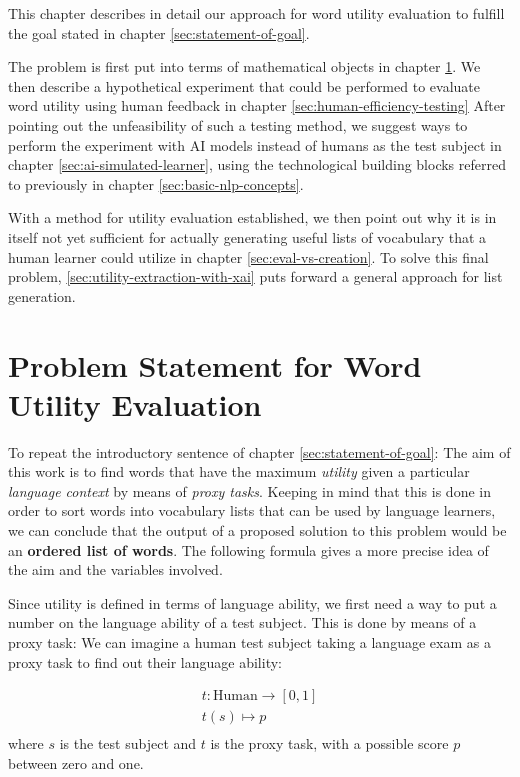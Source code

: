 This chapter describes in detail our approach for word utility evaluation to fulfill the goal stated in chapter \ref{sec:statement-of-goal}.

The problem is first put into terms of mathematical objects in chapter \ref{sec:problem-statement-formal}.
We then describe a hypothetical experiment that could be performed to evaluate word utility using human feedback in chapter \ref{sec:human-efficiency-testing}
After pointing out the unfeasibility of such a testing method, we suggest ways to perform the experiment with AI models instead of humans as the test subject in chapter \ref{sec:ai-simulated-learner}, using the technological building blocks referred to previously in chapter \ref{sec:basic-nlp-concepts}.

With a method for utility evaluation established, we then point out why it is in itself not yet sufficient for actually generating useful lists of vocabulary that a human learner could utilize in chapter \ref{sec:eval-vs-creation}.
To solve this final problem, \ref{sec:utility-extraction-with-xai} puts forward a general approach for list generation.

\section{Problem Statement for Word Utility Evaluation} \label{sec:problem-statement-formal}


To repeat the introductory sentence of chapter \ref{sec:statement-of-goal}:
The aim of this work is to find words that have the maximum \textit{utility} given a particular \textit{language context} by means of \textit{proxy tasks}.
Keeping in mind that this is done in order to sort words into vocabulary lists that can be used by language learners, we can conclude that the output of a proposed solution to this problem would be an \textbf{ordered list of words}. The following formula gives a more precise idea of the aim and the variables involved.

Since utility is defined in terms of language ability, we first need a way to put a number on the language ability of a test subject. This is done by means of a proxy task: We can imagine a human test subject taking a language exam as a proxy task to find out their language ability:

\begin{align*}
	t: \text{Human} \to [0, 1] \\
	t (s) \mapsto p            \\
\end{align*}
where $s$ is the test subject and $t$ is the proxy task, with a possible score $p$ between zero and one.

